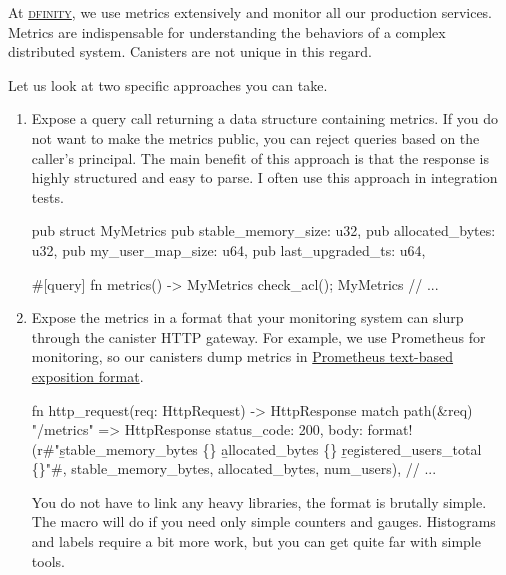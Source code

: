 \documentclass{article}
\begin{document}
At \href{https://dfinity.org/}{\textsc{dfinity}}, we use metrics extensively and monitor all our production services.
Metrics are indispensable for understanding the behaviors of a complex distributed system.
Canisters are not unique in this regard.


Let us look at two specific approaches you can take.

\begin{enumerate}
\item 
  Expose a query call returning a data structure containing metrics.
  If you do not want to make the metrics public, you can reject queries based on the caller's principal.
  The main benefit of this approach is that the response is highly structured and easy to parse.
  I often use this approach in integration tests.

\begin{code}[good]
pub struct MyMetrics {
  pub stable_memory_size: u32,
  pub allocated_bytes: u32,
  pub my_user_map_size: u64,
  pub last_upgraded_ts: u64,
}

#[query]
fn metrics() -> MyMetrics {
  check_acl();
  MyMetrics {
    // ...
  }
}
\end{code}
\item 

  Expose the metrics in a format that your monitoring system can slurp through the canister HTTP gateway.
  For example, we use Prometheus for monitoring, so our canisters dump metrics in \href{https://prometheus.io/docs/instrumenting/exposition_formats/#text-based-format}{Prometheus text-based exposition format}.

\begin{code}[good]
fn http_request(req: HttpRequest) -> HttpResponse {
  match path(&req) {
    "/metrics" => HttpResponse {
        status_code: 200,
        body: format!(r#"\b{stable_memory_bytes \{\}}
                         \b{allocated_bytes \{\}}
                         \b{registered_users_total \{\}}"#,
                      stable_memory_bytes, allocated_bytes, num_users),
        // ...
    }
  }
}
\end{code}

  You do not have to link any heavy libraries, the format is brutally simple.
  The  macro will do if you need only simple counters and gauges.
  Histograms and labels require a bit more work, but you can get quite far with simple tools.
\end{enumerate}
\end{document}
